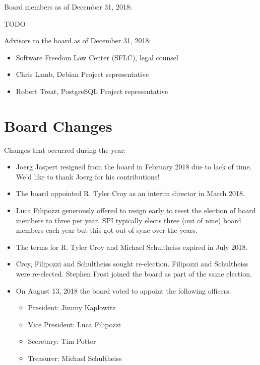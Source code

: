 \documentclass[a4paper]{report}
\begin{document}
Board members as of December 31, 2018:

TODO

Advisors to the board as of December 31, 2018:

\begin{itemize}
\item Software Freedom Law Center (SFLC), legal counsel
\item Chris Lamb, Debian Project representative
\item Robert Treat, PostgreSQL Project representative
\end{itemize}

\section{Board Changes}

Changes that occurred during the year:

\begin{itemize}

\item Joerg Jaspert resigned from the board in February 2018 due to
lack of time.  We'd like to thank Joerg for his contributions!

\item The board appointed R. Tyler Croy as an interim director in March
2018.

\item Luca Filipozzi generously offered to resign early to reset the
election of board members to three per year. SPI typically elects three
(out of nine) board members each year but this got out of sync over the
years.

\item The terms for R. Tyler Croy and Michael Schultheiss expired in
July 2018.

\item Croy, Filipozzi and Schultheiss sought re-election.  Filipozzi and
Schultheiss were re-elected.  Stephen Frost joined the board as part of
the same election.

\item On August 13, 2018 the board voted to appoint the following
officers:

\begin{itemize}
\item President: Jimmy Kaplowitz
\item Vice President: Luca Filipozzi
\item Secretary: Tim Potter
\item Treasurer: Michael Schultheiss
\end{itemize}

\end{itemize}
\end{document}
